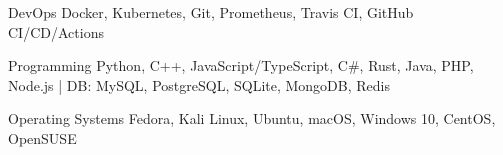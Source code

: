 

\begin{cvskills}

  \cvskill
    {DevOps} %
    {Docker, Kubernetes, Git, Prometheus, Travis CI, GitHub CI/CD/Actions} %

  \cvskill
    {Programming} %
    {Python, C++, JavaScript/TypeScript, C\#, Rust, Java, PHP, Node.js | DB: MySQL, PostgreSQL, SQLite, MongoDB, Redis} %
    
    
  \cvskill
    {Operating Systems} %
    {Fedora, Kali Linux, Ubuntu, macOS, Windows 10, CentOS, OpenSUSE} %
%

\end{cvskills}
\vspace{-3.0mm}